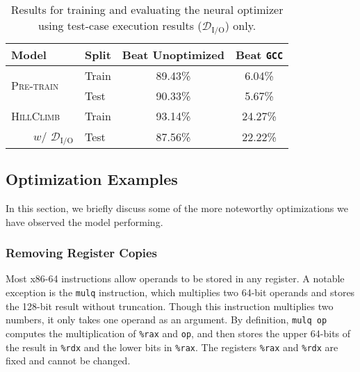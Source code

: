 \documentclass{article}
\def\correctfuncio/{\ensuremath{\mathcal{D}_\textrm{I/O}}}
\begin{document}
\begin{table}[t]
\small
\centering
\caption{Results for training and evaluating the neural optimizer using test-case execution results (\correctfuncio/) only.}
\begin{tabular}{llcc}
\toprule
\textbf{Model}                              & \textbf{Split} & \textbf{Beat Unoptimized} & \textbf{Beat \texttt{GCC}} \\ \midrule
\multirow{2}{*}{\textsc{Pre-train}}          & Train & 89.43\%          & 6.04\%   \\
                                   & Test  & 90.33\%          & 5.67\%   \\ \midrule
\textsc{HillClimb}                          & Train & 93.14\%          & 24.27\%   \\
~~~~$w$/ \correctfuncio/ & Test  & 87.56\%          & 22.22\%   \\  \bottomrule 
\end{tabular}
\label{tab:z3_eval_results}
\end{table}



\subsection{Optimization Examples}

\label{sec:sec:opt_examples}

\newcommand{\ozerocodecaption}{-O0 code\xspace}
\newcommand{\ogcodecaption}{-Og code\xspace}
\newcommand{\modelcodecaption}{Model-optimized code\xspace}
\newcommand{\codeboxwidth}{.47\columnwidth}

In this section, we briefly discuss some of the more noteworthy optimizations we have observed the model performing.

\subsubsection{Removing Register Copies}
Most x86-64 instructions allow operands to be stored in any register.  A notable exception is the \lstinline{mulq} instruction, which multiplies two 64-bit operands and stores the 128-bit result without truncation.
%
Though this instruction multiplies two numbers, it only takes one operand as an argument.  By definition, \lstinline{mulq op} computes the multiplication of \lstinline{%rax} and \lstinline{op}, and then stores the upper 64-bits of the result in \lstinline{%rdx} and the lower bits in \lstinline{%rax}.  The registers \lstinline{%rax} and \lstinline{%rdx} are fixed and cannot be changed.
%
\end{document}
